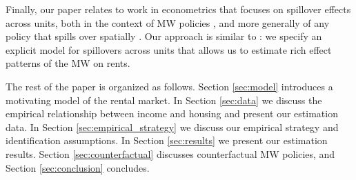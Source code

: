 Finally, our paper relates to work in econometrics that focuses on spillover 
effects across units,
both in the context of MW policies 
\parencite{Kuehn2016, JardimEtAl2022discontinuity}, 
and more generally of any policy that spills over spatially
\parencite{DelgadoFlorax2015, Butts2021}.
Our approach is similar to \textcite{GiroudMueller2019}: we specify an explicit 
model for spillovers across units that allows us to estimate rich effect 
patterns of the MW on rents.

The rest of the paper is organized as follows.
Section \ref{sec:model} introduces a motivating model of the rental market.
In Section \ref{sec:data} we discuss the empirical relationship between income 
and housing and present our estimation data.
In Section \ref{sec:empirical_strategy} we discuss our empirical strategy and
identification assumptions.
In Section \ref{sec:results} we present our estimation results.
Section \ref{sec:counterfactual} discusses counterfactual MW policies, and
Section \ref{sec:conclusion} concludes.
